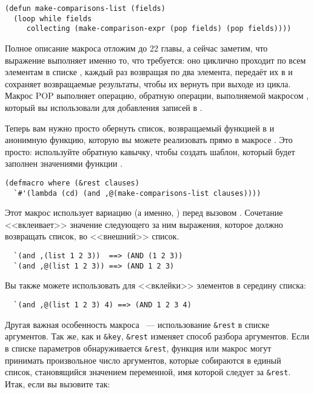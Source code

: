 \begin{lstlisting}
(defun make-comparisons-list (fields)
  (loop while fields
     collecting (make-comparison-expr (pop fields) (pop fields))))
\end{lstlisting}

Полное описание макроса  отложим до 22 главы, а сейчас заметим, что выражение
 выполняет именно то, что требуется: оно циклично проходит по всем элементам в
списке , каждый раз возвращая по два элемента, передаёт их в
 и сохраняет возвращаемые результаты, чтобы их вернуть при
выходе из цикла. Макрос POP выполняет операцию, обратную операции, выполняемой макросом
, который вы использовали для добавления записей в .

Теперь вам нужно просто обернуть список, возвращаемый функцией 
в  и анонимную функцию, которую вы можете реализовать прямо в макросе
. Это просто: используйте обратную кавычку, чтобы создать шаблон, который
будет заполнен значениями функции .

\begin{lstlisting}
(defmacro where (&rest clauses)
  `#'(lambda (cd) (and ,@(make-comparisons-list clauses))))
\end{lstlisting}

Этот макрос использует вариацию \code{,} (а именно, ) перед вызовом
. Сочетание  <<вклеивает>> значение следующего за ним
выражения, которое должно возвращать список, во <<внешний>> список.

\begin{verbatim}
  `(and ,(list 1 2 3))  ==> (AND (1 2 3))
  `(and ,@(list 1 2 3)) ==> (AND 1 2 3)
\end{verbatim}

Вы также можете использовать  для <<вклейки>> элементов в середину списка:

\begin{verbatim}
  `(and ,@(list 1 2 3) 4) ==> (AND 1 2 3 4)
\end{verbatim}

Другая важная особенность макроса ~--- использование \lstinline{&rest} в списке
аргументов. Так же, как и \lstinline!&key!, \lstinline{&rest} изменяет способ разбора
аргументов. Если в списке параметров обнаруживается \lstinline{&rest}, функция или макрос могут
принимать произвольное число аргументов, которые собираются в единый список, становящийся
значением переменной, имя которой следует за \lstinline{&rest}. Итак, если вы вызовите
 так:

